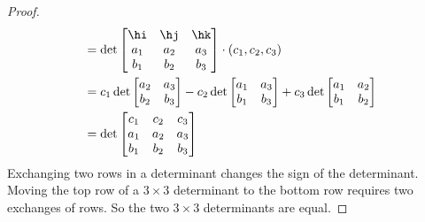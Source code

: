 \begin{proof}
\begin{align*}
&=\det\left[\begin{matrix}\hi&\hj&\hk\\
                     a_1&a_2&a_3\\
                     b_1&b_2&b_3\end{matrix}\right]\cdot(c_1,c_2,c_3)\\
&=c_1\det\left[\begin{matrix}
                                       a_2&a_3\\
                                       b_2&b_3\end{matrix}\right]
                             -c_2\det\left[\begin{matrix}
                                       a_1&a_3\\
                                       b_1&b_3\end{matrix}\right]
                             +c_3\det\left[\begin{matrix}
                                       a_1&a_2\\
                                       b_1&b_2\end{matrix}\right]\\
&=\det\left[\begin{matrix}c_1&c_2&c_3\cr a_1&a_2&a_3\\
                                       b_1&b_2&b_3\\
                                       \end{matrix}\right]
\end{align*}
Exchanging two rows in a determinant changes the sign of the determinant.
Moving the top row of a $3\times 3$ determinant to the bottom row requires
two exchanges of rows.
So the two $3\times 3$ determinants are equal.


\end{proof}
